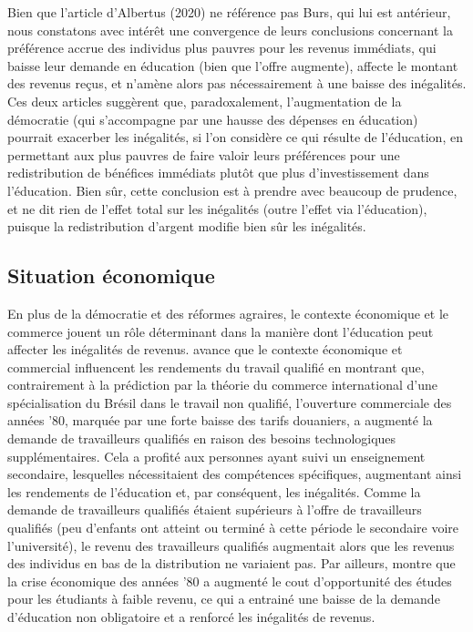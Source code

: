 \documentclass[pagesize, twoside=off, bibliography=totoc, DIV=calc, fontsize=12pt, a4paper, french]{scrartcl}
\begin{document}
Bien que l’article d’Albertus (2020) ne référence pas Burs, qui lui est antérieur, nous constatons avec intérêt une convergence de leurs conclusions concernant la préférence accrue des individus plus pauvres pour les revenus immédiats, qui baisse leur demande en éducation (bien que l’offre augmente), affecte le montant des revenus reçus, et n’amène alors pas nécessairement à une baisse des inégalités.
Ces deux articles suggèrent que, paradoxalement, l’augmentation de la démocratie (qui s’accompagne par une hausse des dépenses en éducation) pourrait exacerber les inégalités, si l’on considère ce qui résulte de l’éducation, en permettant aux plus pauvres de faire valoir leurs préférences pour une redistribution de bénéfices immédiats plutôt que plus d’investissement dans l’éducation.
Bien sûr, cette conclusion est à prendre avec beaucoup de prudence, et ne dit rien de l’effet total sur les inégalités (outre l’effet via l’éducation), puisque la redistribution d’argent modifie bien sûr les inégalités.

\subsection{Situation économique}

En plus de la démocratie et des réformes agraires, le contexte économique et le commerce jouent un rôle déterminant dans la manière dont l’éducation peut affecter les inégalités de revenus.
 avance que le contexte économique et commercial influencent les rendements du travail qualifié en montrant que, contrairement à la prédiction par la théorie du commerce international d’une spécialisation du Brésil dans le travail non qualifié, l’ouverture commerciale des années ’80, marquée par une forte baisse des tarifs douaniers, a augmenté la demande de travailleurs qualifiés en raison des besoins technologiques supplémentaires.
Cela a profité aux personnes ayant suivi un enseignement secondaire, lesquelles nécessitaient des compétences spécifiques, augmentant ainsi les rendements de l’éducation et, par conséquent, les inégalités.
Comme la demande de travailleurs qualifiés étaient supérieurs à l’offre de travailleurs qualifiés (peu d’enfants ont atteint ou terminé à cette période le secondaire voire l’université), le revenu des travailleurs qualifiés augmentait alors que les revenus des individus en bas de la distribution ne variaient pas.
Par ailleurs, \citet{urbina} montre que la crise économique des années ’80 a augmenté le cout d’opportunité des études pour les étudiants à faible revenu, ce qui a entrainé une baisse de la demande d’éducation non obligatoire et a renforcé les inégalités de revenus.
\end{document}
